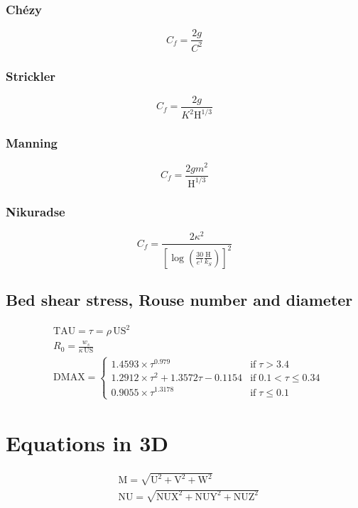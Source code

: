 \documentclass{article}
\newcommand{\HAU}{\mathrm{H}}
\newcommand{\U}{\mathrm{U}}
\newcommand{\V}{\mathrm{V}}
\newcommand{\M}{\mathrm{M}}
\newcommand{\US}{\mathrm{US}}
\newcommand{\DMAX}{\mathrm{DMAX}}
\newcommand{\TAU}{\mathrm{TAU}}
\newcommand{\IF}{\mathrm{if}\;}
\begin{document}
\begin{multicols}{2}
\subsubsection{Chézy}
\[C_f = \frac{2 g}{C^2}\]

\subsubsection{Strickler}
\[ C_f = \frac{2 g}{K^2 \HAU^{1/3}}\]

\subsubsection{Manning}
\[ C_f = \frac{2 g m^2}{\HAU^{1/3}}\]

\subsubsection{Nikuradse}

\[ C_f = \frac{2 \kappa^2}{ \left[ \log\left(\frac{30}{e^1} \frac{\HAU}{k_S}\right) \right] ^2} \]
\end{multicols}


\subsection{Bed shear stress, Rouse number and diameter}
\[\begin{aligned}
& \TAU = \tau = \rho \,\US^2\\
& R_0 = \frac{w_s}{\kappa\, \US}\\
& \DMAX = \begin{cases}
     1.4593 \times \tau^{0.979} &\IF   \tau > 3.4 \\
     1.2912 \times \tau^2 + 1.3572 \tau - 0.1154
    &\IF 0.1 < \tau \leqslant 0.34 \\
     0.9055 \times \tau^{1.3178} &\IF \tau \leqslant 0.1
  \end{cases}
\end{aligned}\]


\section{Equations in 3D}

\[\begin{aligned}
& \M = \sqrt{\U^2+\V^2+\mathrm{W}^2}\\
& \mathrm{NU} = \sqrt{\mathrm{NUX}^2+\mathrm{NUY}^2+\mathrm{NUZ}^2}
\end{aligned}\]
\end{document}
